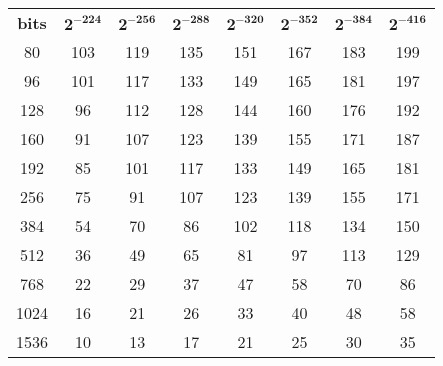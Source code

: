 \documentclass[synpaper]{book}
\begin{document}
\newpage
\begin{table}[h]
  \begin{center}
    \begin{tabular}{c c c c c c c c}
      \textbf{bits}       & $\mathbf{2^{-224}}$ & $\mathbf{2^{-256}}$ & $\mathbf{2^{-288}}$ &
      $\mathbf{2^{-320}}$ & $\mathbf{2^{-352}}$ & $\mathbf{2^{-384}}$ & $\mathbf{2^{-416}}$
      \\
      80                  & 103                 & 119                 & 135                 & 151 &
      167                 & 183                 & 199
      \\
      96                  & 101                 & 117                 & 133                 & 149 &
      165                 & 181                 & 197
      \\
      128                 & 96                  & 112                 & 128                 & 144 &
      160                 & 176                 & 192
      \\
      160                 & 91                  & 107                 & 123                 & 139 &
      155                 & 171                 & 187
      \\
      192                 & 85                  & 101                 & 117                 & 133 &
      149                 & 165                 & 181
      \\
      256                 & 75                  & 91                  & 107                 & 123 &
      139                 & 155                 & 171
      \\
      384                 & 54                  & 70                  & 86                  & 102 &
      118                 & 134                 & 150
      \\
      512                 & 36                  & 49                  & 65                  & 81  &
      97                  & 113                 & 129
      \\
      768                 & 22                  & 29                  & 37                  & 47  &
      58                  & 70                  & 86
      \\
      1024                & 16                  & 21                  & 26                  & 33  &
      40                  & 48                  & 58
      \\
      1536                & 10                  & 13                  & 17                  & 21  &
      25                  & 30                  & 35

\end{tabular}
\end{center}
\end{table}
\end{document}
